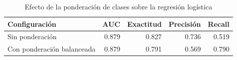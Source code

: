 \begin{table}[H]
\centering
\caption{Efecto de la ponderación de clases sobre la regresión logística}
\label{tab:balanceo}
\small
\begin{tabular}{p{5cm} r r r r}
\toprule
\textbf{Configuración} & \textbf{AUC} & \textbf{Exactitud} & \textbf{Precisión} & \textbf{Recall} \\
\midrule
Sin ponderación & 0.879 & 0.827 & 0.736 & 0.519 \\
Con ponderación balanceada & 0.879 & 0.791 & 0.569 & 0.790 \\
\bottomrule
\end{tabular}
\end{table}
